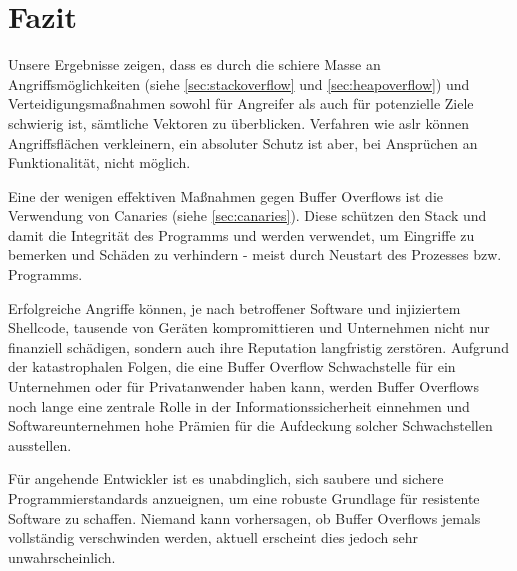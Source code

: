 \pagebreak

\section{Fazit}
Unsere Ergebnisse zeigen, dass es durch die schiere Masse an Angriffsmöglichkeiten (siehe \autoref{sec:stackoverflow} und \ref*{sec:heapoverflow})
und Verteidigungsmaßnahmen sowohl für Angreifer als auch für potenzielle Ziele schwierig ist, sämtliche Vektoren zu überblicken. 
Verfahren wie \gls*{aslr} können Angriffsflächen verkleinern, ein absoluter Schutz ist aber, bei Ansprüchen an Funktionalität, nicht möglich.

Eine der wenigen effektiven Maßnahmen gegen Buffer Overflows ist die Verwendung von Canaries (siehe \autoref{sec:canaries}).
Diese schützen den Stack und damit die Integrität des Programms und werden verwendet, um Eingriffe zu bemerken und Schäden zu verhindern - meist durch Neustart
des Prozesses bzw. Programms.

Erfolgreiche Angriffe können, je nach betroffener Software und injiziertem Shellcode, tausende von Geräten kompromittieren und
Unternehmen nicht nur finanziell schädigen, sondern auch ihre Reputation langfristig zerstören. 
Aufgrund der katastrophalen Folgen, die eine Buffer Overflow Schwachstelle für ein Unternehmen oder für Privatanwender 
haben kann, werden Buffer Overflows noch lange eine zentrale Rolle in der Informationssicherheit einnehmen und 
Softwareunternehmen hohe Prämien für die Aufdeckung solcher Schwachstellen ausstellen. 

Für angehende Entwickler ist es unabdinglich, sich saubere und sichere Programmierstandards anzueignen, um eine robuste Grundlage für resistente Software zu schaffen. 
Niemand kann vorhersagen, ob Buffer Overflows jemals vollständig verschwinden werden, aktuell erscheint dies jedoch sehr unwahrscheinlich.




















